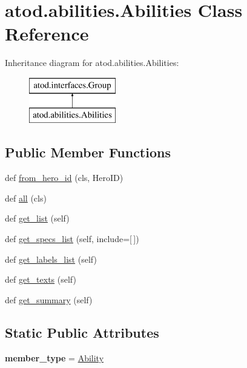 \hypertarget{classatod_1_1abilities_1_1_abilities}{}\section{atod.\+abilities.\+Abilities Class Reference}
\label{classatod_1_1abilities_1_1_abilities}
Inheritance diagram for atod.\+abilities.\+Abilities\+:\begin{figure}[H]
\begin{center}
\leavevmode
\includegraphics[height=2.000000cm]{classatod_1_1abilities_1_1_abilities}
\end{center}
\end{figure}
\subsection*{Public Member Functions}
\begin{DoxyCompactItemize}
\item 
def \hyperlink{classatod_1_1abilities_1_1_abilities_a1594c605444025644a197875b8b51faa}{from\+\_\+hero\+\_\+id} (cls, Hero\+ID)
\item 
def \hyperlink{classatod_1_1abilities_1_1_abilities_a097c69ffe687d823506a74aa18efc867}{all} (cls)
\item 
def \hyperlink{classatod_1_1abilities_1_1_abilities_aa86cdc4abf4ee615197c09dfb43300ca}{get\+\_\+list} (self)
\item 
def \hyperlink{classatod_1_1abilities_1_1_abilities_a51916c4d551758aef056df33276ccd74}{get\+\_\+specs\+\_\+list} (self, include=\mbox{[}$\,$\mbox{]})
\item 
def \hyperlink{classatod_1_1abilities_1_1_abilities_a2cc0448d65e22ab6d9da0a784d0276c5}{get\+\_\+labels\+\_\+list} (self)
\item 
def \hyperlink{classatod_1_1abilities_1_1_abilities_a51f21a6496e8061f58f6de24c5e74ac5}{get\+\_\+texts} (self)
\item 
def \hyperlink{classatod_1_1abilities_1_1_abilities_a332197169464ae88a9251d36989b9876}{get\+\_\+summary} (self)
\end{DoxyCompactItemize}
\subsection*{Static Public Attributes}
\begin{DoxyCompactItemize}
\item 
{\bfseries member\+\_\+type} = \hyperlink{classatod_1_1abilities_1_1_ability}{Ability}\hypertarget{classatod_1_1abilities_1_1_abilities_ac16ab1be4985ec9cda43bddd3e34cece}{}\label{classatod_1_1abilities_1_1_abilities_ac16ab1be4985ec9cda43bddd3e34cece}

\end{DoxyCompactItemize}
